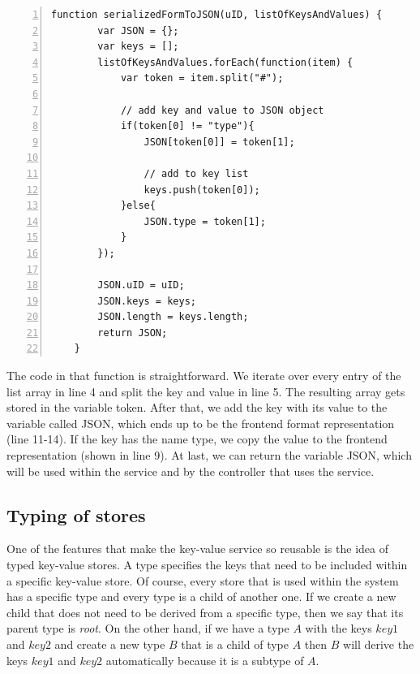 \begin{lstlisting}[numbers=left,caption={The translation from the backend data format to the frontend data format within the key value service.},label=keyTranslation,frame=tlbr,breaklines]
   function serializedFormToJSON(uID, listOfKeysAndValues) {
        var JSON = {};
        var keys = [];
        listOfKeysAndValues.forEach(function(item) {
            var token = item.split("#");

            // add key and value to JSON object
            if(token[0] != "type"){
                JSON[token[0]] = token[1];

                // add to key list
                keys.push(token[0]);
            }else{
                JSON.type = token[1];
            }
        });

        JSON.uID = uID;
        JSON.keys = keys;
        JSON.length = keys.length;
        return JSON;
    }
\end{lstlisting}

The code in that function is straightforward. We iterate over every entry of the list array in line 4 and split the key and value in line 5. The resulting array gets stored in the variable token.
After that, we add the key with its value to the variable called JSON, which ends up to be the frontend format representation (line 11-14). If the key has the name type, we copy the value to the frontend representation (shown in line 9). At last, we can return the variable JSON, which will be used within the service and by the controller that uses the service.

\subsection{Typing of stores}
\label{typedKVS}
One of the features that make the key-value service so reusable is the idea of typed key-value stores. A type specifies the keys that need to be included within a specific key-value store. Of course, every store that is used within the system has a specific type and every type is a child of another one. If we create a new child that does not need to be derived from a specific type, then we say that its parent type is \emph{root}.
On the other hand, if we have a type $A$ with the keys $key1$ and $key2$ and create a new type $B$ that is a child of type $A$ then $B$ will derive the keys $key1$ and $key2$ automatically because it is a subtype of $A$.

